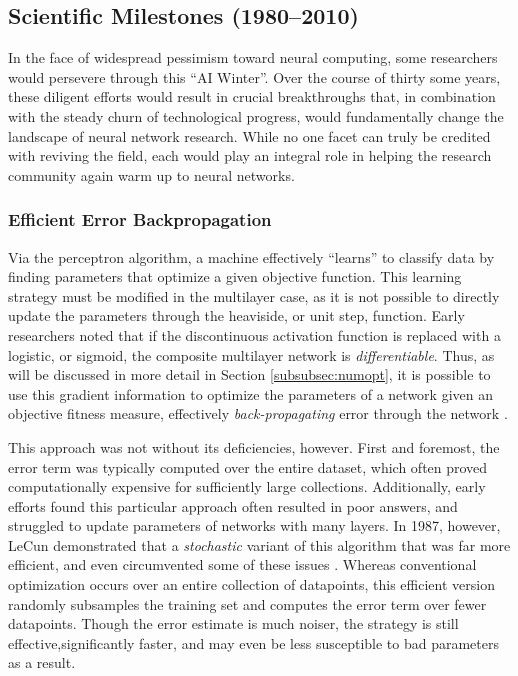\subsection{Scientific Milestones (1980--2010)}
\label{sec:advances}

In the face of widespread pessimism toward neural computing, some researchers would persevere through this ``AI Winter''.
Over the course of thirty some years, these diligent efforts would result in crucial breakthroughs that, in combination with the steady churn of technological progress, would fundamentally change the landscape of neural network research.
While no one facet can truly be credited with reviving the field, each would play an integral role in helping the research community again warm up to neural networks.

\subsubsection{Efficient Error Backpropagation}
\label{subsec:sgd}

Via the perceptron algorithm, a machine effectively ``learns'' to classify data by finding parameters that optimize a given objective function.
This learning strategy must be modified in the multilayer case, as it is not possible to directly update the parameters through the heaviside, or unit step, function.
Early researchers noted that if the discontinuous activation function is replaced with a logistic, or sigmoid, the composite multilayer network is \emph{differentiable}.
Thus, as will be discussed in more detail in Section \ref{subsubsec:numopt}, it is possible to use this gradient information to optimize the parameters of a network given an objective fitness measure, effectively \emph{back-propagating} error through the network \cite{Hinton1986}.

This approach was not without its deficiencies, however.
First and foremost, the error term was typically computed over the entire dataset, which often proved computationally expensive for sufficiently large collections.
Additionally, early efforts found this particular approach often resulted in poor answers, and struggled to update parameters of networks with many layers.
In 1987, however, LeCun demonstrated that a \emph{stochastic} variant of this algorithm that was far more efficient, and even circumvented some of these issues \cite{LeCun1987}.
Whereas conventional optimization occurs over an entire collection of datapoints, this efficient version randomly subsamples the training set and computes the error term over fewer datapoints.
Though the error estimate is much noiser, the strategy is still effective,significantly faster, and may even be less susceptible to bad parameters as a result.


